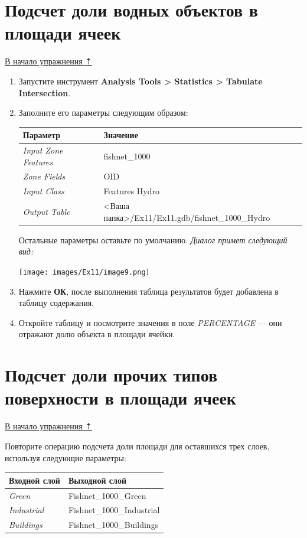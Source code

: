 \documentclass[12pt,]{book}
\begin{document}
\hypertarget{land-cover-hydro-waters}{%
\section{Подсчет доли водных объектов в площади ячеек}\label{land-cover-hydro-waters}}

\protect\hyperlink{land-cover-hydro}{В начало упражнения ⇡}

\begin{enumerate}
\def\labelenumi{\arabic{enumi}.}
\item
  Запустите инструмент \textbf{Analysis Tools \textgreater{} Statistics \textgreater{} Tabulate Intersection}.
\item
  Заполните его параметры следующим образом:

  \begin{longtable}[]{@{}ll@{}}
  \toprule
  Параметр & Значение\tabularnewline
  \midrule
  \endhead
  \emph{Input Zone Features} & fishnet\_1000\tabularnewline
  \emph{Zone Fields} & OID\tabularnewline
  \emph{Input Class} & Features Hydro\tabularnewline
  \emph{Output Table} & \textless{}Ваша папка\textgreater{}/Ex11/Ex11.gdb/fishnet\_1000\_Hydro\tabularnewline
  \bottomrule
  \end{longtable}

  Остальные параметры оставьте по умолчанию. \emph{Диалог примет следующий вид:}

  \texttt{[image: images/Ex11/image9.png]}
\item
  Нажмите \textbf{ОК}, после выполнения таблица результатов будет добавлена в таблицу содержания.
\item
  Откройте таблицу и посмотрите значения в поле \emph{PERCENTAGE} --- они отражают долю объекта в площади ячейки.
\end{enumerate}

\hypertarget{land-cover-hydro-others}{%
\section{Подсчет доли прочих типов поверхности в площади ячеек}\label{land-cover-hydro-others}}

\protect\hyperlink{land-cover-hydro}{В начало упражнения ⇡}

Повторите операцию подсчета доли площади для оставшихся трех слоев, используя следующие параметры:

\begin{longtable}[]{@{}ll@{}}
\toprule
Входной слой & Выходной слой\tabularnewline
\midrule
\endhead
\emph{Green} & Fishnet\_1000\_Green\tabularnewline
\emph{Industrial} & Fishnet\_1000\_Industrial\tabularnewline
\emph{Buildings} & Fishnet\_1000\_Buildings\tabularnewline
\bottomrule
\end{longtable}
\end{document}
